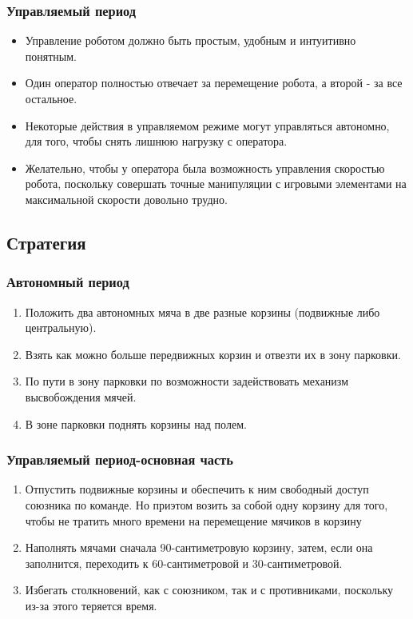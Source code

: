 \documentclass[12pt]{article}
\begin{document}
	  \subsubsection{Управляемый период}
	    \begin{itemize}
	    	\item Управление роботом должно быть простым, удобным и интуитивно понятным.
	    	\item Один оператор полностью отвечает за перемещение робота, а второй - за все остальное.
	    	\item Некоторые действия в управляемом режиме могут управляться автономно, для того, чтобы снять лишнюю нагрузку с оператора.
	    	\item Желательно, чтобы у оператора была возможность управления скоростью робота, поскольку совершать точные манипуляции с игровыми элементами на максимальной скорости довольно трудно.
	    \end{itemize}
	  \subsection{Стратегия} 
	     \subsubsection{Автономный период}
	       \begin{enumerate}
	       	\item Положить два автономных мяча в две разные корзины (подвижные либо центральную).
	       	\item Взять как можно больше передвижных корзин и отвезти их в зону парковки.
	       	\item По пути в зону парковки по возможности задействовать механизм высвобождения мячей.
	       	\item В зоне парковки поднять корзины над полем.      	
	       \end{enumerate}
	      \subsubsection{Управляемый период-основная часть}
	      \begin{enumerate}
	      	\item Отпустить подвижные корзины и обеспечить к ним свободный доступ союзника по команде. Но приэтом возить за собой одну корзину для того, чтобы не тратить много времени на перемещение мячиков в корзину
	      	\item Наполнять мячами сначала 90-сантиметровую корзину, затем, если она заполнится, переходить к 60-сантиметровой и 30-сантиметровой.
	      	\item Избегать столкновений, как с союзником, так и с противниками, поскольку из-за этого теряется время.
	      \end{enumerate}
\end{document}
